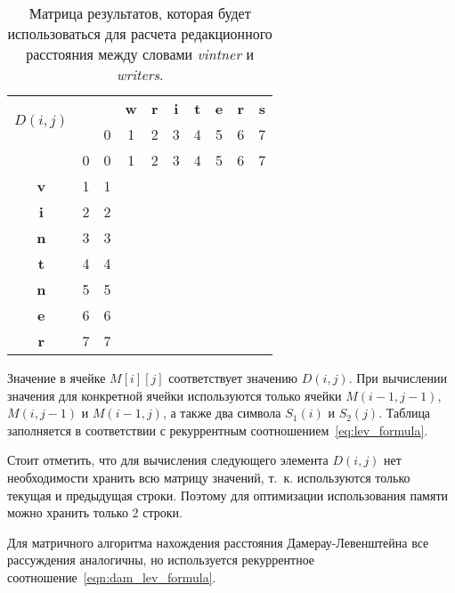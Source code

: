\begin{table}[htb]
\caption{\centering Матрица результатов, которая будет использоваться для расчета редакционного расстояния между словами \textit{vintner} и \textit{writers}.}
\small
\centering\begin{tabular}{|c|c|c|c|c|c|c|c|c|c|}
    \hline
    \multirow{2}{*}{$D(i,j)$} & \multirow{2}{*}{} & \multirow{1}{*}{} & \multirow{1}{*}{\textbf{w}} & \multirow{1}{*}{\textbf{r}} & \multirow{1}{*}{\textbf{i}} & \multirow{1}{*}{\textbf{t}} & \multirow{1}{*}{\textbf{e}} & \multirow{1}{*}{\textbf{r}} & \multirow{1}{*}{\textbf{s}} \\ \cline{3-10}
    & & 0 & 1 & 2 & 3 & 4 & 5 & 6 & 7 \\ \hline
    & 0 & 0 & 1 & 2 & 3 & 4 & 5 & 6 & 7 \\ \hline
    \textbf{v} & 1 & 1 & & & & & & & \\ \hline
    \textbf{i} & 2 & 2 & & & & & & & \\ \hline
    \textbf{n} & 3 & 3 & & & & & & & \\ \hline
    \textbf{t} & 4 & 4 & & & & & & & \\ \hline
    \textbf{n} & 5 & 5 & & & & & & & \\ \hline
    \textbf{e} & 6 & 6 & & & & & & & \\ \hline
    \textbf{r} & 7 & 7 & & & & & & & \\ \hline
\end{tabular}
\label{table:matrix}
\end{table}

Значение в ячейке \(M[i][j]\) соответствует значению \(D(i, j)\). При вычислении значения для конкретной ячейки используются только ячейки \(M(i - 1, j - 1)\), \(M(i, j - 1)\) и \(M(i - 1, j)\), а также два символа \(S_1(i)\) и \(S_2(j)\). Таблица заполняется в соответствии с рекуррентным соотношением~\ref{eq:lev_formula}.

Стоит отметить, что для вычисления следующего элемента \(D(i, j)\) нет необходимости хранить всю матрицу значений, т.~к. используются только текущая и предыдущая строки. Поэтому для оптимизации использования памяти можно хранить только 2 строки.

Для матричного алгоритма нахождения расстояния Дамерау-Левенштейна все рассуждения аналогичны, но используется рекуррентное соотношение~\ref{eqn:dam_lev_formula}.